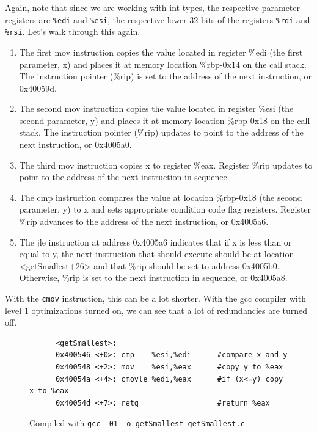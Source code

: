 \documentclass{article}
\begin{document}
  Again, note that since we are working with int types, the respective parameter registers are \texttt{\%edi} and \texttt{\%esi}, the respective lower 32-bits of the registers \texttt{\%rdi} and \texttt{\%rsi}. Let's walk through this again. 
  \begin{enumerate}
    \item The first mov instruction copies the value located in register \%edi (the first parameter, x) and places it at memory location \%rbp-0x14 on the call stack. The instruction pointer (\%rip) is set to the address of the next instruction, or 0x40059d.
    \item The second mov instruction copies the value located in register \%esi (the second parameter, y) and places it at memory location \%rbp-0x18 on the call stack. The instruction pointer (\%rip) updates to point to the address of the next instruction, or 0x4005a0.
    \item The third mov instruction copies x to register \%eax. Register \%rip updates to point to the address of the next instruction in sequence.
    \item The cmp instruction compares the value at location \%rbp-0x18 (the second parameter, y) to x and sets appropriate condition code flag registers. Register \%rip advances to the address of the next instruction, or 0x4005a6.
    \item The jle instruction at address 0x4005a6 indicates that if x is less than or equal to y, the next instruction that should execute should be at location <getSmallest+26> and that \%rip should be set to address 0x4005b0. Otherwise, \%rip is set to the next instruction in sequence, or 0x4005a8.
  \end{enumerate}

  With the \texttt{cmov} instruction, this can be a lot shorter. With the gcc compiler with level 1 optimizations turned on, we can see that a lot of redundancies are turned off. 

  \begin{figure}[H]
    \centering 
    \begin{lstlisting}
      <getSmallest>:
      0x400546 <+0>: cmp    %esi,%edi      #compare x and y
      0x400548 <+2>: mov    %esi,%eax      #copy y to %eax
      0x40054a <+4>: cmovle %edi,%eax      #if (x<=y) copy x to %eax
      0x40054d <+7>: retq                  #return %eax
    \end{lstlisting}
    \caption{Compiled with \texttt{gcc -01 -o getSmallest getSmallest.c} } 
    \label{fig:if_statement_optimized}
  \end{figure}
\end{document}
